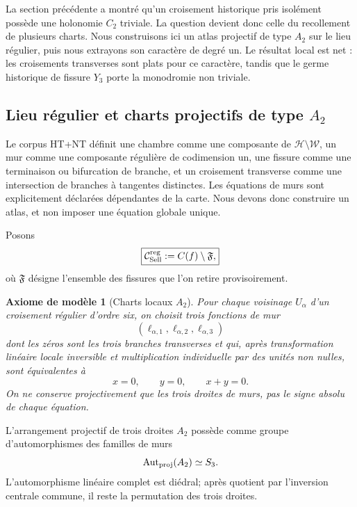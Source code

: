 \documentclass[11pt,a4paper]{article}
\newtheorem{axiom}[theorem]{Axiome de modèle}
\begin{document}
La section précédente a montré qu'un croisement historique pris isolément possède une holonomie $C_2$ triviale. La question devient donc celle du recollement de plusieurs charts. Nous construisons ici un atlas projectif de type $A_2$ sur le lieu régulier, puis nous extrayons son caractère de degré un. Le résultat local est net : les croisements transverses sont plats pour ce caractère, tandis que le germe historique de fissure $Y_3$ porte la monodromie non triviale.

\subsection{Lieu régulier et charts projectifs de type \texorpdfstring{$A_2$}{A2}}

Le corpus HT+NT définit une chambre comme une composante de $\mathcal H\setminus\mathcal W$, un mur comme une composante régulière de codimension un, une fissure comme une terminaison ou bifurcation de branche, et un croisement transverse comme une intersection de branches à tangentes distinctes. Les équations de murs sont explicitement déclarées dépendantes de la carte. Nous devons donc construire un atlas, et non imposer une équation globale unique.

Posons
\begin{equation}\label{eq:v16-regular-locus}
 \boxed{
 \mathcal C_{\rm Sell}^{\rm reg}
 :=
 C(f)\setminus\mathfrak F,}
\end{equation}
où $\mathfrak F$ désigne l'ensemble des fissures que l'on retire provisoirement.

\begin{axiom}[Charts locaux $A_2$]\label{hyp:v16-A2-atlas}
Pour chaque voisinage $U_\alpha$ d'un croisement régulier d'ordre six, on choisit trois fonctions de mur
\[
 (\ell_{\alpha,1},\ell_{\alpha,2},\ell_{\alpha,3})
\]
dont les zéros sont les trois branches transverses et qui, après transformation linéaire locale inversible et multiplication individuelle par des unités non nulles, sont équivalentes à
\[
 x=0,\qquad y=0,\qquad x+y=0.
\]
On ne conserve projectivement que les trois droites de murs, pas le signe absolu de chaque équation.
\end{axiom}

L'arrangement projectif de trois droites $A_2$ possède comme groupe d'automorphismes des familles de murs
\[
 \operatorname{Aut}_{\rm proj}(A_2)
 \simeq S_3.
\]
L'automorphisme linéaire complet est diédral; après quotient par l'inversion centrale commune, il reste la permutation des trois droites.
\end{document}
